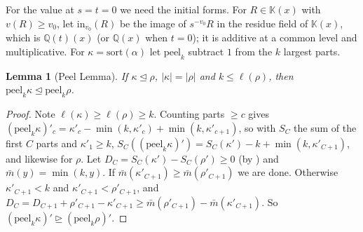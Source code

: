 \documentclass[11pt]{amsart}
\newtheorem{lemma}[theorem]{Lemma}
\theoremstyle{definition}
\theoremstyle{remark}
\numberwithin{equation}{section}
\begin{document}
For the value at $s=t=0$ we need the initial forms. For $R\in\mathbb{K}(x)$ with $v(R)\ge v_0$, let $\mathrm{in}_{v_0}(R)$ be the image of $s^{-v_0}R$ in the residue field of $\mathbb{K}(x)$, which is $\mathbb{Q}(t)(x)$ (or $\mathbb{Q}(x)$ when $t=0$); it is additive at a common level and multiplicative. For $\kappa=\mathrm{sort}(\alpha)$ let $\mathrm{peel}_k$ subtract $1$ from the $k$ largest parts.

\begin{lemma}[Peel Lemma]\label{lem:peelmono}
If $\kappa\trianglelefteq\rho$, $|\kappa|=|\rho|$ and $k\le\ell(\rho)$, then $\mathrm{peel}_k\kappa\trianglelefteq\mathrm{peel}_k\rho$.
\end{lemma}
\begin{proof}
Note $\ell(\kappa)\ge\ell(\rho)\ge k$. Counting parts $\ge c$ gives $(\mathrm{peel}_k\kappa)'_c=\kappa'_c-\min(k,\kappa'_c)+\min(k,\kappa'_{c+1})$, so with $S_C$ the sum of the first $C$ parts and $\kappa'_1\ge k$, $S_C((\mathrm{peel}_k\kappa)')=S_C(\kappa')-k+\min(k,\kappa'_{C+1})$, and likewise for $\rho$. Let $D_C=S_C(\kappa')-S_C(\rho')\ge0$ (by \cite[I (1.11)]{Macdonald95}) and $\bar m(y)=\min(k,y)$. If $\bar m(\kappa'_{C+1})\ge\bar m(\rho'_{C+1})$ we are done. Otherwise $\kappa'_{C+1}<k$ and $\kappa'_{C+1}<\rho'_{C+1}$, and $D_C=D_{C+1}+\rho'_{C+1}-\kappa'_{C+1}\ge\bar m(\rho'_{C+1})-\bar m(\kappa'_{C+1})$. So $(\mathrm{peel}_k\kappa)'\trianglerighteq(\mathrm{peel}_k\rho)'$.
\end{proof}
\end{document}
